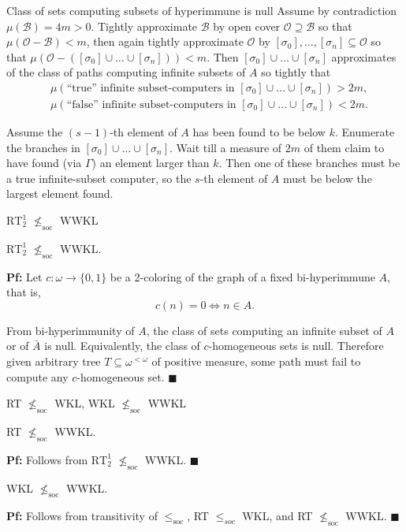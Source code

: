 \begin{frame}{Class of sets computing subsets of hyperimmune is null}
  Assume by contradiction $\mu(\mathcal{B})=4m>0$. Tightly approximate
  $\mathcal{B}$ by open cover $\mathcal{O}\supseteq\mathcal{B}$ so that
  $\mu(\mathcal{O}-\mathcal{B})<m$, then again tightly approximate
  $\mathcal{O}$ by $[\sigma_0],\ldots,[\sigma_n] \subseteq\mathcal{O}$ so
  that $\mu(\mathcal{O}-([\sigma_0]\cup\ldots\cup[\sigma_n])) <m$.
  Then $[\sigma_0]\cup\ldots\cup[\sigma_n]$ approximates of the class
  of paths computing infinite subsets of $A$ so tightly that
  \begin{align*}
    &\mu(\text{``true'' infinite subset-computers in }
    [\sigma_0]\cup\ldots\cup[\sigma_n])>2m,\\
    &\mu(\text{``false'' infinite subset-computers in }
    [\sigma_0]\cup\ldots\cup[\sigma_n])<2m.
  \end{align*}

  Assume the $(s-1)$-th element of $A$ has been found to be below $k$.
  Enumerate the branches in $[\sigma_0]\cup\ldots\cup[\sigma_n]$.  Wait
  till a measure of $2m$ of them claim to have found (via $\Gamma$) an
  element larger than $k$. Then one of these branches must be a true
  infinite-subset computer, so the $s$-th element of $A$ must be below the
  largest element found.
\end{frame}

\begin{frame}{$\text{RT}_2^1$ $\nleq_{\text{soc}}$ WWKL}
  \begin{thm}
    $\text{RT}_2^1$ $\nleq_{\text{soc}}$ WWKL.
  \end{thm}

  \vspace{1em}
  \textbf{Pf:} Let $c:\omega\rightarrow\{0,1\}$ be a 2-coloring of the
  graph of a fixed bi-hyperimmune $A$, that is,
  \[c(n)=0 \Leftrightarrow n\in A.\]
  
  From bi-hyperimmunity of $A$, the class of sets computing an infinite
  subset of $A$ or of $\bar{A}$ is null. Equivalently, the class of
  $c$-homogeneous sets is null. Therefore given arbitrary tree
  $T\subseteq\omega^{<\omega}$ of positive measure, some path must fail to
  compute any $c$-homogeneous set. $\blacksquare$
\end{frame}

\begin{frame}{RT $\nleq_{\text{soc}}$ WKL, WKL $\nleq_{\text{soc}}$ WWKL}
  \begin{coro}
    \label{coro:rt-wwkl}
    RT $\nleq_{\text{soc}}$ WWKL.
  \end{coro}
  \textbf{Pf:} Follows from $\text{RT}_2^1$ $\nleq_{\text{soc}}$ WWKL.
  $\blacksquare$

  \vspace{2em}
  \begin{coro}
    WKL $\nleq_{\text{soc}}$ WWKL.
  \end{coro}
  \textbf{Pf:} Follows from transitivity of $\leq_\text{soc}$,
  RT $\leq_{soc}$ WKL, and RT $\nleq_{\text{soc}}$ WWKL. $\blacksquare$
\end{frame}
